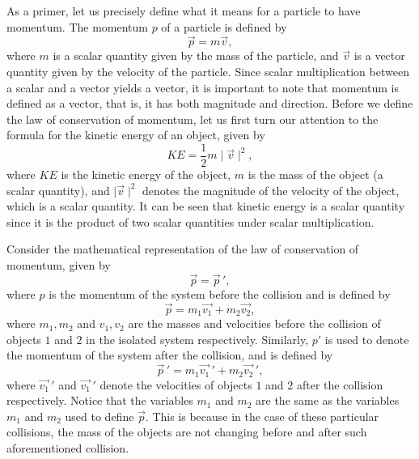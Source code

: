 \documentclass{article}
\theoremstyle{definition}
\begin{document}
As a primer, let us precisely define what it means for a particle to have momentum. The momentum $p$ of a particle is defined by 
\begin{equation}
    \vec{p} = m\vec{v},
\end{equation}
where $m$ is a scalar quantity given by the mass of the particle, and $\vec{v}$ is a vector quantity given by the velocity of the particle. 
Since scalar multiplication between a scalar and a vector yields a vector, it is important to note that momentum is defined as a vector, that 
is, it has both magnitude and direction. Before we define the law of conservation of momentum, let us first turn our attention to
the formula for the kinetic energy of an object, given by 
\begin{equation}
    K\!E = \frac{1}{2}m \! \mid \! \vec{v} \! \mid ^2, 
\end{equation}
where $K\!E$ is the kinetic energy of the object, $m$ is the mass of the object (a scalar quantity), and 
$\mid \! \! \vec{v} \! \mid ^2$ denotes the magnitude of the velocity of the object, which is a scalar quantity. It can be seen that
kinetic energy is a scalar quantity since it is the product of two scalar quantities under scalar multiplication. 

Consider the mathematical representation of the law of conservation of momentum, given by 
\begin{equation}
    \vec{p} = \vec{p} \,',
\end{equation}
where $p$ is the momentum of the system before the collision and is defined by 
\begin{equation}
    \vec{p} = m_1 \vec{v_1} + m_2 \vec{v_2},
\end{equation}
where $m_1, m_2$ and $v_1, v_2$ are the masses and velocities before the collision of objects $1$ and $2$ in the isolated system respectively.
Similarly, $p'$ is used to denote the momentum of the system after the collision, and is defined by 
\begin{equation}
    \vec{p} \,' = m_1 \vec{v_1}\,' + m_2 \vec{v_2}\,',
\end{equation}
where $\vec{v_1}\,'$ and $\vec{v_1}\,'$ denote the velocities of objects $1$ and $2$ after the collision respectively. Notice that 
the variables $m_1$ and $m_2$ are the same as the variables $m_1$ and $m_2$ used to define $\vec{p}$. This is because in the case of these particular collisions, 
the mass  of the objects are not changing before and after such aforementioned collision. 
\end{document}

